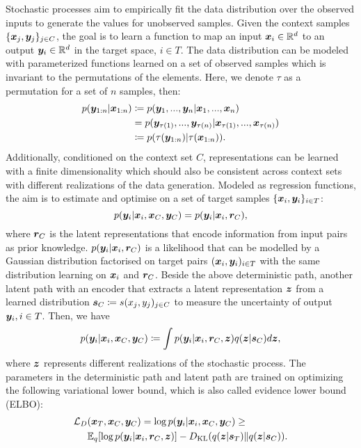 \documentclass[sigconf]{acmart} %
\begin{document}
Stochastic processes aim to empirically fit the data distribution over the observed inputs to generate the values for unobserved samples.
Given the context samples $\{{\bm{x}}_j,{\bm{y}}_j\}_{j\in C}$, the goal is to learn a function to map an input ${\bm{x}}_i \in \mathbb{R}^{d}$ to an output ${\bm{y}}_i \in \mathbb{R}^{d}$ in the target space, $i\in T$. 
The data distribution can be modeled with parameterized functions learned on a set of observed samples which is invariant to the permutations of the elements. Here, we denote $\tau$ as a permutation for a set of $n$ samples, then: 
\begin{equation}
\begin{aligned}
    p({\bm{y}}_{1:n}|{\bm{x}}_{1:n}) &\coloneqq p({\bm{y}}_1,...,{\bm{y}}_n|{\bm{x}}_1,...,{\bm{x}}_n)\\
    &= p({\bm{y}}_{\tau(1)},...,{\bm{y}}_{\tau(n)}|{\bm{x}}_{\tau(1)},...,{\bm{x}}_{\tau(n)})\\
    &\coloneqq p(\tau({\bm{y}}_{1:n})|\tau({\bm{x}}_{1:n})).
\end{aligned}
\end{equation}
Additionally, conditioned on the context set $C$, representations can be learned with a finite dimensionality which should also be consistent across context sets with different realizations of the data generation.
Modeled as regression functions, the aim is to estimate and optimise on a set of target samples $\{{\bm{x}}_i,{\bm{y}}_i\}_{i\in T}$:
\begin{equation}
    p({\bm{y}}_i|{\bm{x}}_i,{\bm{x}}_C,{\bm{y}}_C) = p({\bm{y}}_i|{\bm{x}}_i,{\bm{r}}_C),
\end{equation}
where ${\bm{r}}_C$ is the latent representations that encode information from input pairs as prior knowledge.
$p({\bm{y}}_i|{\bm{x}}_i,{\bm{r}}_C)$ is a likelihood that can be modelled by a Gaussian distribution factorised on target pairs $({\bm{x}}_i,{\bm{y}}_i)_{i \in T}$ with the same distribution learning on ${\bm{x}}_i$ and ${\bm{r}}_C$. 
Beside the above deterministic path, another latent path with an encoder that extracts a latent representation ${\bm{z}}$ from a learned distribution ${\bm{s}}_C \coloneqq s(x_j, y_j)_{j\in C}$ to measure the uncertainty of output ${\bm{y}}_i, i\in T$. Then, we have
\begin{equation}
    p({\bm{y}}_i|{\bm{x}}_i,{\bm{x}}_C,{\bm{y}}_C) \coloneqq \int  p({\bm{y}}_i|{\bm{x}}_i,{\bm{r}}_C,{\bm{z}}) q({\bm{z}}|{\bm{s}}_C) d{\bm{z}},
\end{equation}
where ${\bm{z}}$ represents different realizations of the stochastic process. 
The parameters in the deterministic path and latent path are trained on optimizing the following variational lower bound, which is also called evidence lower bound (ELBO):
\begin{equation}
    \label{eq:loss}
    \begin{aligned}
        \mathcal{L}_D&({\bm{x}}_T,{\bm{x}}_C,{\bm{y}}_C) = \log p({\bm{y}}_i|{\bm{x}}_i,{\bm{x}}_C,{\bm{y}}_C) \geq\\
        &\mathbb{E}_{q}  [\log p({\bm{y}}_i|{\bm{x}}_i,{\bm{r}}_C,{\bm{z}})] -
        D_{\mathrm{KL}} ( q({\bm{z}}|{\bm{s}}_T) \Vert q({\bm{z}}|{\bm{s}}_C) ).
    \end{aligned}
\end{equation}
\end{document}
